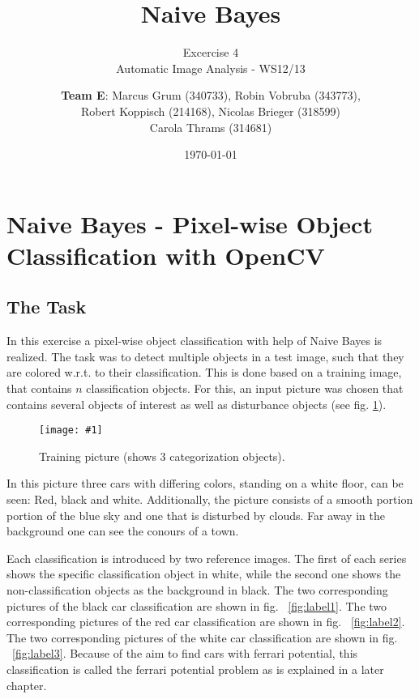 \documentclass[a4paper,headings=small]{scrartcl}
\title{Naive Bayes}
\subtitle{Excercise 4 \\ Automatic Image Analysis - WS12/13}
\author{\textbf{Team E}: Marcus Grum (340733), Robin Vobruba (343773), \\ Robert Koppisch (214168), Nicolas Brieger (318599)\\Carola Thrams (314681)}
\date{\today}
\numberwithin{equation}{section} %
\numberwithin{figure}{section}   %
\newcommand{\image}[3]{
	\begin{figure}[htbp]
		\centering
		\texttt{[image: \#1]}
		\caption{#3}
		\label{fig:#1}
	\end{figure}
}
\newcommand{\imgRoot}{../resources/img}
\begin{document}
\maketitle


\section{Naive Bayes - Pixel-wise Object Classification with OpenCV}


\subsection{The Task}
In this exercise a pixel-wise object classification with help of Naive Bayes is realized.
The task was to detect multiple objects in a test image,
such that they are colored w.r.t. to their classification.
This is done based on a training image, that contains $n$ classification objects.
For this, an input picture was chosen that contains several objects of interest as well as disturbance objects (see fig. \ref{fig:\imgRoot/Input.png}).

\image{\imgRoot/Input.png}{0.9}{%
		Training picture (shows 3 categorization objects).}
\newpage
In this picture three cars with differing colors, standing on a white floor, can be seen: Red, black and white.
Additionally, the picture consists of a smooth portion portion of the blue sky and one that is disturbed by clouds.
Far away in the background one can see the conours of a town.

Each classification is introduced by two reference images.
The first of each series shows the specific classification object in white,
while the second one shows the non-classification objects as the background in black.
The two corresponding pictures of the black car classification are shown in fig. ~\ref{fig:label1}.
The two corresponding pictures of the red car classification are shown in fig. ~\ref{fig:label2}.
The two corresponding pictures of the white car classification are shown in fig. ~\ref{fig:label3}.
Because of the aim to find cars with ferrari potential, this classification is called
the ferrari potential problem as is explained in a later chapter.
\end{document}

